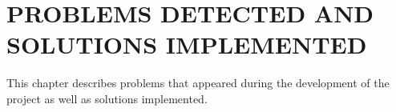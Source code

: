 \section{PROBLEMS DETECTED AND SOLUTIONS IMPLEMENTED}
This chapter describes problems that appeared during the development of the project as well as solutions implemented.